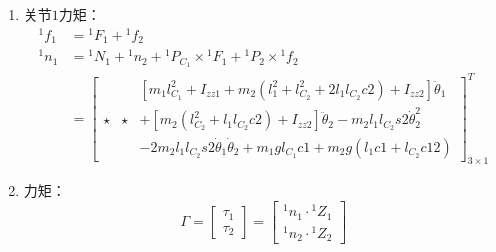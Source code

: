 \documentclass[
12pt, %
a4paper, 
oneside, %
]{scrartcl}
\begin{document}
{\begin{enumerate}
\begin{align*}
{}^1 n_2 &= {}^1 N_2 + {}^1 P_{C_2} \times {}^1 F_2 = \begin{bmatrix} 0 & 0 & (I_{zz2} + m_2 l_{C_2}^2)(\ddot{\theta}_1 + \ddot{\theta}_2) + m_2 l_1 l_{C_2}c2 \ddot{\theta}_1 - m_2 l_1 l_{C_2}s2 \dot{\theta}_1^2 + m_2 g l_{C_2}c12 \end{bmatrix}^T
\end{align*}
\item 关节$ 1 $力矩：
\begin{align*}
{}^1 f_1 &= {}^1 F_1 + {}^1 f_2 \\
{}^1 n_1 &= {}^1 N_1 + {}^1 n_2 + {}^1 P_{C_1} \times {}^1 F_1 + {}^1 P_2 \times {}^1 f_2 \\
&= \begin{bmatrix} 
& & [m_1 l_{C_1}^2 + I_{zz1} + m_2(l_1^2 + l_{C_2}^2 + 2l_1 l_{C_2}c2) + I_{zz2}]\ddot{\theta}_1 \\
\star & \star & + [m_2(l_{C_2}^2 + l_1 l_{C_2}c2) + I_{zz2}]\ddot{\theta}_2 - m_2 l_1 l_{C_2}s2 \dot{\theta}_2^2 \\
& & - 2m_2 l_1 l_{C_2}s2 \dot{\theta}_1 \dot{\theta}_2 + m_1 g l_{C_1}c1 + m_2 g(l_1 c1 + l_{C_2}c12) 
\end{bmatrix}^T_{3 \times 1}
\end{align*}
\item 力矩：
$$ \Gamma = \begin{bmatrix} \tau_1 \\ \tau_2 \end{bmatrix} = \begin{bmatrix} {}^1 n_1 \cdot {}^1 Z_1 \\ {}^1 n_2 \cdot {}^1 Z_2 \end{bmatrix} $$
\end{enumerate}
}
\end{document}
